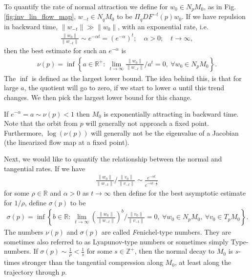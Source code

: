 To quantify the rate of normal attraction we define for $w_0 \in N_{p}M_0$, as in Fig. \ref{fig:inv_lin_flow_map}, $w_{-t}\in N_{q}M_0$ to be $\Pi_{q}DF^{-t}(p)w_0 $. If we have repulsion in backward time, $\| w_{-t}\| \gg \| w_0\|$, with an exponential rate, i.e. 
\begin{align}
	\frac{\|w_0 \|}{\| w_{-t}\|}\sim e^{-\alpha t}	= (e^{-\alpha })^{t}; \quad \alpha >0; \quad t \to \infty ,
\end{align}
then the best estimate for such an $e^{-\alpha }$ is 
\begin{align}
	\boxed{
		\nu(p) = \inf \left\{ a \in \mathbb{R}^{+}:\ \lim_{t\to\infty }{\frac{\|w_0\|}{\|w_{-t}\|}}/{a^{t}} = 0,\ \forall w_0 \in N_{p}M_0 \right\}.
	}
\end{align}
The $\inf $ is defined as the largest lower bound. The idea behind this, is that for large $a$, the quotient will go to zero, if we start to lower $a$ until this trend changes. We then pick the largest lower bound for this change.

If $e^{-\alpha }=a \sim \nu(p) < 1$ then $M_0$ is exponentially attracting in backward time. Note that the orbit from $p$ will generally not approach a fixed point. Furthermore, $\log(\nu(p))$ will generally not be the eigenvalue of a Jacobian (the linearized flow map at a fixed point).

Next, we would like to quantify the relationship between the normal and tangential rates. If we have
\begin{align}
{\frac{\| w_0 \|}{\|w_{-t}\|}}/{\frac{\|v_0\|}{\|v_{-t}\|}} \sim \frac{e^{-\alpha t}}{e^{-\alpha t \cdot \frac{1}{\rho}}}
\end{align}
for some $\rho \in \mathbb{R}$ and $\alpha >0$ as $t\to \infty $ then define for the best asymptotic estimate for $1/\rho$, define $\sigma(p)$ to be
\begin{align}
	\boxed{
		\sigma(p) = \inf \left\{ b \in \mathbb{R}:\ \lim_{t\to \infty }\left({\frac{\|w_0\|}{\|w_{-t}\|}} \right) ^{b} /{\frac{\|v_0\|}{\|v_{-t}\|}} = 0,\ \forall w_0 \in N_{p}M_0,\ \forall v_0 \in T_{p}M_0 \right\}.
	}
\end{align}
The numbers $\nu(p)$ and $\sigma(p)$ are called {\emph Fenichel-type numbers}. They are sometimes also referred to as Lyapunov-type numbers or sometimes simply Type-numbers. If $\sigma(p) \sim \frac{1}{\rho} < \frac{1}{s}$ for some $s\in \mathbb{Z}^{+}$, then the normal decay to $M_0$ is $s$-times stronger than the tangential compression along $M_0$, at least along the trajectory through $p$.

